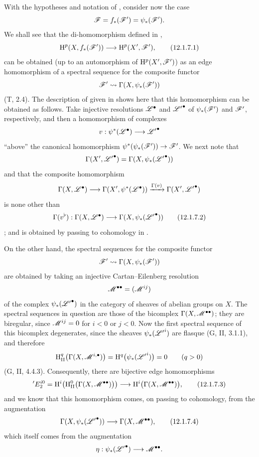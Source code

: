 \begin{env}[12.1.7]
\label{0.12.1.7}
With the hypotheses and notation of , consider now the
case
\[
  \mathscr{F}=f_*(\mathscr{F}')=\psi_*(\mathscr{F}').
\]
We shall see that the di-homomorphism defined in ,
\[
  \mathrm{H}^p(X,f_*(\mathscr{F}'))\longrightarrow\mathrm{H}^p(X',\mathscr{F}'),
  \tag{12.1.7.1}
  \label{0.12.1.7.1}
\]
can be obtained (up to an automorphism of $\mathrm{H}^p(X',\mathscr{F}')$) as an
edge homomorphism of a spectral sequence for the composite functor
\[
  \mathscr{F}'\leadsto\Gamma(X,\psi_*(\mathscr{F}'))
\]
(T, 2.4).
The description of  given in  shows
here that this homomorphism can be obtained as follows.
Take injective resolutions $\mathscr{L}^\bullet$ and
${\mathscr{L}'}^\bullet$ of $\psi_*(\mathscr{F}')$ and $\mathscr{F}'$,
respectively, and then a homomorphism of complexes
\[
  v:\psi^*(\mathscr{L}^\bullet)\longrightarrow{\mathscr{L}'}^\bullet
\]
``above'' the canonical homomorphism
$\psi^*(\psi_*(\mathscr{F}'))\to\mathscr{F}'$.
We next note that
\[
  \Gamma(X',{\mathscr{L}'}^\bullet)
  =\Gamma(X,\psi_*({\mathscr{L}'}^\bullet))
\]
and that the composite homomorphism
\[
  \Gamma(X,\mathscr{L}^\bullet)
  \longrightarrow\Gamma(X',\psi^*(\mathscr{L}^\bullet))
  \xrightarrow{\Gamma(v)}\Gamma(X',{\mathscr{L}'}^\bullet)
\]
is none other than
\[
  \Gamma(v^\flat):
  \Gamma(X,\mathscr{L}^\bullet)
  \longrightarrow\Gamma(X,\psi_*({\mathscr{L}'}^\bullet))
  \tag{12.1.7.2}
  \label{0.12.1.7.2}
\]
; and  is
obtained by passing to cohomology in .

On the other hand, the spectral sequences for the composite functor
\[
  \mathscr{F}'\leadsto\Gamma(X,\psi_*(\mathscr{F}'))
\]
are obtained by taking an injective Cartan--Eilenberg resolution
\[
  \mathscr{M}^{\bullet\bullet}=(\mathscr{M}^{ij})
\]
of the complex $\psi_*({\mathscr{L}'}^\bullet)$ in the category of
sheaves of abelian groups on $X$.
The spectral sequences in question are those of the bicomplex
$\Gamma(X,\mathscr{M}^{\bullet\bullet})$; they are biregular, since
$\mathscr{M}^{ij}=0$ for $i<0$ or $j<0$.
Now the first spectral sequence of this bicomplex degenerates, since
the sheaves $\psi_*({\mathscr{L}'}^i)$ are flasque (G, II, 3.1.1), and
therefore
\[
  \mathrm{H}_\mathrm{II}^q
    \bigl(\Gamma(X,\mathscr{M}^{i,\bullet})\bigr)
  =\mathrm{H}^q\bigl(\psi_*({\mathscr{L}'}^i)\bigr)=0
  \qquad(q>0)
\]
(G, II, 4.4.3).
Consequently, there are bijective edge homomorphisms
\[
  {}'E_2^{i0}
  =\mathrm{H}^i\!\left(
      \mathrm{H}_\mathrm{II}^0
        \bigl(\Gamma(X,\mathscr{M}^{\bullet\bullet})\bigr)
    \right)
  \longrightarrow
  \mathrm{H}^i\bigl(\Gamma(X,\mathscr{M}^{\bullet\bullet})\bigr),
  \tag{12.1.7.3}
  \label{0.12.1.7.3}
\]
and we know  that this homomorphism comes, on passing
to cohomology, from the augmentation
\[
  \Gamma(X,\psi_*({\mathscr{L}'}^\bullet))
  \longrightarrow\Gamma(X,\mathscr{M}^{\bullet\bullet}),
  \tag{12.1.7.4}
  \label{0.12.1.7.4}
\]
which itself comes from the augmentation
\[
  \eta:\psi_*({\mathscr{L}'}^\bullet)
  \longrightarrow\mathscr{M}^{\bullet\bullet}.
\]


\end{env}
